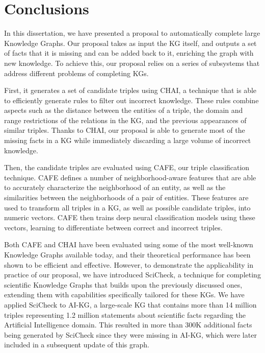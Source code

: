 \chapter{Conclusions}\label{chap:conclusions}


\vspace{1cm}

\noindent In this dissertation, we have presented a proposal to automatically complete large Knowledge Graphs. Our proposal takes as input the KG itself, and outputs a set of facts that it is missing and can be added back to it, enriching the graph with new knowledge. To achieve this, our proposal relies on a series of subsystems that address different problems of completing KGs.

First, it generates a set of candidate triples using CHAI, a technique that is able to efficiently generate rules to filter out incorrect knowledge. These rules combine aspects such as the distance between the entities of a triple, the domain and range restrictions of the relations in the KG, and the previous appearances of similar triples. Thanks to CHAI, our proposal is able to generate most of the missing facts in a KG while immediately discarding a large volume of incorrect knowledge.

Then, the candidate triples are evaluated using CAFE, our triple classification technique. CAFE defines a number of neighborhood-aware features that are able to accurately characterize the neighborhood of an entity, as well as the similarities between the neighborhoods of a pair of entities. These features are used to transform all triples in a KG, as well as possible candidate triples, into numeric vectors. CAFE then trains deep neural classification models using these vectors, learning to differentiate between correct and incorrect triples.

Both CAFE and CHAI have been evaluated using some of the most well-known Knowledge Graphs available today, and their theoretical performance has been shown to be efficient and effective. However, to demonstrate the applicability in practice of our proposal, we have introduced SciCheck, a technique for completing scientific Knowledge Graphs that builds upon the previously discussed ones, extending them with capabilities specifically tailored for these KGs. We have applied SciCheck to AI-KG, a large-scale KG that contains more than 14 million triples representing 1.2 million statements about scientific facts regarding the Artificial Intelligence domain. This resulted in more than 300K additional facts being generated by SciCheck since they were missing in AI-KG, which were later included in a subsequent update of this graph.


